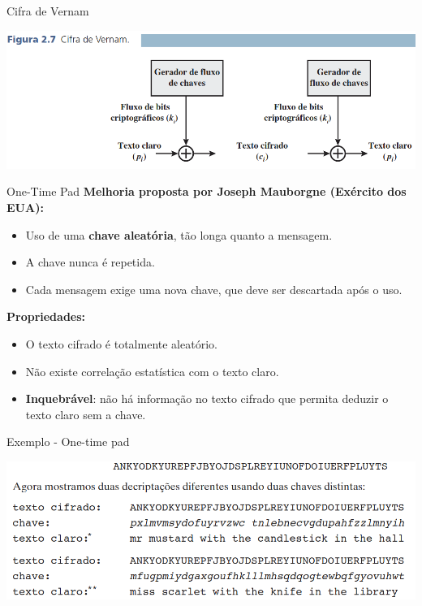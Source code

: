 \begin{frame}{Cifra de Vernam}


    \centering
    \includegraphics[width=\linewidth]{Figuras/cifra-de-vernam.png}



\end{frame}


\begin{frame}{One-Time Pad}
    \textbf{Melhoria proposta por Joseph Mauborgne (Exército dos EUA):}
    \begin{itemize}
        \item Uso de uma \textbf{chave aleatória}, tão longa quanto a mensagem.
        \item A chave nunca é repetida.
        \item Cada mensagem exige uma nova chave, que deve ser descartada após o uso.
    \end{itemize}

    \medskip
    \textbf{Propriedades:}
    \begin{itemize}
        \item O texto cifrado é totalmente aleatório.
        \item Não existe correlação estatística com o texto claro.
        \item \textbf{Inquebrável}: não há informação no texto cifrado que permita deduzir o texto claro sem a chave.
    \end{itemize}

\end{frame}

\begin{frame}{Exemplo - One-time pad}


    \centering
    \includegraphics[width=\linewidth]{Figuras/exemplo-one-time-pad.png}



\end{frame}

